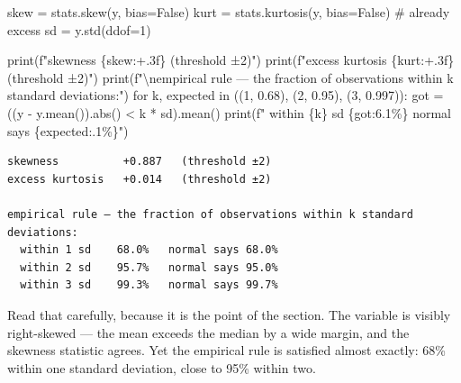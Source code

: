 \documentclass[
  letterpaper,
  10pt,
  twoside,
  openright,
  numbers=noenddot,
  chapterprefix=true]{scrbook}
\newenvironment{Shaded}{}{}
\newcommand{\BuiltInTok}[1]{\textcolor[rgb]{0.84,0.23,0.29}{#1}}
\newcommand{\CharTok}[1]{\textcolor[rgb]{0.01,0.18,0.38}{#1}}
\newcommand{\CommentTok}[1]{\textcolor[rgb]{0.42,0.45,0.49}{#1}}
\newcommand{\ControlFlowTok}[1]{\textcolor[rgb]{0.84,0.23,0.29}{#1}}
\newcommand{\DecValTok}[1]{\textcolor[rgb]{0.00,0.36,0.77}{#1}}
\newcommand{\FloatTok}[1]{\textcolor[rgb]{0.00,0.36,0.77}{#1}}
\newcommand{\KeywordTok}[1]{\textcolor[rgb]{0.84,0.23,0.29}{#1}}
\newcommand{\NormalTok}[1]{\textcolor[rgb]{0.14,0.16,0.18}{#1}}
\newcommand{\OperatorTok}[1]{\textcolor[rgb]{0.14,0.16,0.18}{#1}}
\newcommand{\SpecialCharTok}[1]{\textcolor[rgb]{0.00,0.36,0.77}{#1}}
\newcommand{\SpecialStringTok}[1]{\textcolor[rgb]{0.01,0.18,0.38}{#1}}
\newcommand{\VariableTok}[1]{\textcolor[rgb]{0.89,0.38,0.04}{#1}}
\begin{document}
\label{check-shape}
\begin{Shaded}
\begin{Highlighting}[]
\NormalTok{skew }\OperatorTok{=}\NormalTok{ stats.skew(y, bias}\OperatorTok{=}\VariableTok{False}\NormalTok{)}
\NormalTok{kurt }\OperatorTok{=}\NormalTok{ stats.kurtosis(y, bias}\OperatorTok{=}\VariableTok{False}\NormalTok{)          }\CommentTok{\# already excess}
\NormalTok{sd }\OperatorTok{=}\NormalTok{ y.std(ddof}\OperatorTok{=}\DecValTok{1}\NormalTok{)}

\BuiltInTok{print}\NormalTok{(}\SpecialStringTok{f"skewness          }\SpecialCharTok{\{}\NormalTok{skew}\SpecialCharTok{:+.3f\}}\SpecialStringTok{   (threshold ±2)"}\NormalTok{)}
\BuiltInTok{print}\NormalTok{(}\SpecialStringTok{f"excess kurtosis   }\SpecialCharTok{\{}\NormalTok{kurt}\SpecialCharTok{:+.3f\}}\SpecialStringTok{   (threshold ±2)"}\NormalTok{)}
\BuiltInTok{print}\NormalTok{(}\SpecialStringTok{f"}\CharTok{\textbackslash{}n}\SpecialStringTok{empirical rule — the fraction of observations within k standard deviations:"}\NormalTok{)}
\ControlFlowTok{for}\NormalTok{ k, expected }\KeywordTok{in}\NormalTok{ ((}\DecValTok{1}\NormalTok{, }\FloatTok{0.68}\NormalTok{), (}\DecValTok{2}\NormalTok{, }\FloatTok{0.95}\NormalTok{), (}\DecValTok{3}\NormalTok{, }\FloatTok{0.997}\NormalTok{)):}
\NormalTok{    got }\OperatorTok{=}\NormalTok{ ((y }\OperatorTok{{-}}\NormalTok{ y.mean()).}\BuiltInTok{abs}\NormalTok{() }\OperatorTok{\textless{}}\NormalTok{ k }\OperatorTok{*}\NormalTok{ sd).mean()}
    \BuiltInTok{print}\NormalTok{(}\SpecialStringTok{f"  within }\SpecialCharTok{\{}\NormalTok{k}\SpecialCharTok{\}}\SpecialStringTok{ sd   }\SpecialCharTok{\{}\NormalTok{got}\SpecialCharTok{:6.1\%\}}\SpecialStringTok{   normal says }\SpecialCharTok{\{}\NormalTok{expected}\SpecialCharTok{:.1\%\}}\SpecialStringTok{"}\NormalTok{)}
\end{Highlighting}
\end{Shaded}

\begin{verbatim}
skewness          +0.887   (threshold ±2)
excess kurtosis   +0.014   (threshold ±2)

empirical rule — the fraction of observations within k standard deviations:
  within 1 sd    68.0%   normal says 68.0%
  within 2 sd    95.7%   normal says 95.0%
  within 3 sd    99.3%   normal says 99.7%
\end{verbatim}

Read that carefully, because it is the point of the section. The
variable is visibly right-skewed --- the mean exceeds the median by a
wide margin, and the skewness statistic agrees. Yet the empirical rule
is satisfied almost exactly: 68\% within one standard deviation, close
to 95\% within two.
\end{document}
